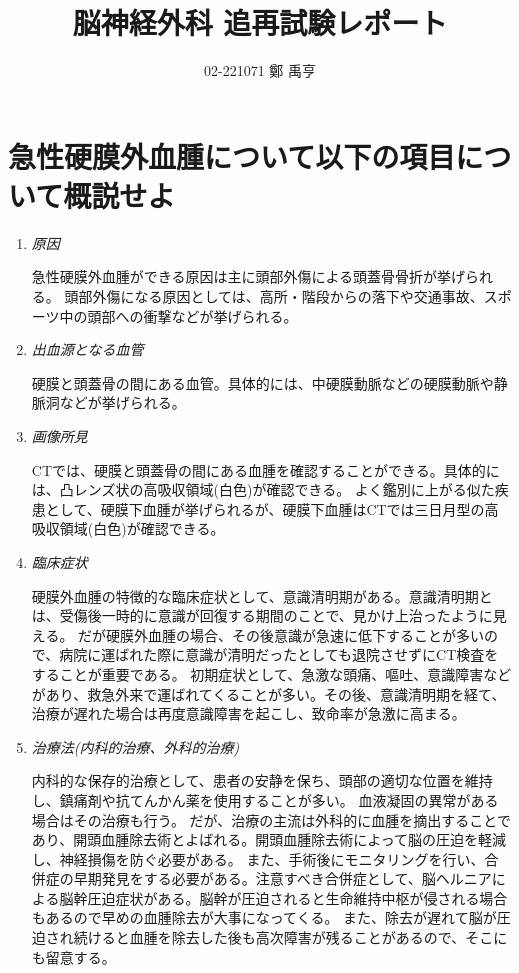 \documentclass[a4paper,10.5pt]{jsarticle}
\begin{document}
\title{脳神経外科 追再試験レポート}
\author{02-221071 鄭 禹亨}
\date{}
\maketitle

\section{急性硬膜外血腫について以下の項目について概説せよ}
\begin{enumerate}
  \item \emph{原因}\par 急性硬膜外血腫ができる原因は主に頭部外傷による頭蓋骨骨折が挙げられる。
  頭部外傷になる原因としては、高所・階段からの落下や交通事故、スポーツ中の頭部への衝撃などが挙げられる。
  \item \emph{出血源となる血管}\par 硬膜と頭蓋骨の間にある血管。具体的には、中硬膜動脈などの硬膜動脈や静脈洞などが挙げられる。
  \item \emph{画像所見}\par CTでは、硬膜と頭蓋骨の間にある血腫を確認することができる。具体的には、凸レンズ状の高吸収領域(白色)が確認できる。
  よく鑑別に上がる似た疾患として、硬膜下血腫が挙げられるが、硬膜下血腫はCTでは三日月型の高吸収領域(白色)が確認できる。
  \item \emph{臨床症状}\par 硬膜外血腫の特徴的な臨床症状として、意識清明期がある。意識清明期とは、受傷後一時的に意識が回復する期間のことで、見かけ上治ったように見える。
  だが硬膜外血腫の場合、その後意識が急速に低下することが多いので、病院に運ばれた際に意識が清明だったとしても退院させずにCT検査をすることが重要である。
  初期症状として、急激な頭痛、嘔吐、意識障害などがあり、救急外来で運ばれてくることが多い。その後、意識清明期を経て、治療が遅れた場合は再度意識障害を起こし、致命率が急激に高まる。
  \item \emph{\textup{治療法(内科的治療、外科的治療)}}\par 内科的な保存的治療として、患者の安静を保ち、頭部の適切な位置を維持し、鎮痛剤や抗てんかん薬を使用することが多い。
  血液凝固の異常がある場合はその治療も行う。
  だが、治療の主流は外科的に血腫を摘出することであり、開頭血腫除去術とよばれる。開頭血腫除去術によって脳の圧迫を軽減し、神経損傷を防ぐ必要がある。
  また、手術後にモニタリングを行い、合併症の早期発見をする必要がある。注意すべき合併症として、脳ヘルニアによる脳幹圧迫症状がある。脳幹が圧迫されると生命維持中枢が侵される場合もあるので早めの血腫除去が大事になってくる。
  また、除去が遅れて脳が圧迫され続けると血腫を除去した後も高次障害が残ることがあるので、そこにも留意する。
\end{enumerate}
\end{document}
